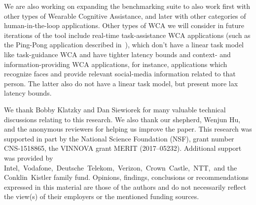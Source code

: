 We are also working on expanding the benchmarking suite to also work first with other types of Wearable Cognitive Assistance, and later with other categories of human-in-the-loop applications.
Other types of WCA we will consider in future iterations of the tool include real-time task-assistance WCA applications (such as the Ping-Pong application described in~\cite{Chen:EarlyImplementation}), which don't have a linear task model like task-guidance WCA and have tighter latency bounds and context- and information-providing WCA applications, for instance, applications which recognize faces and provide relevant social-media information related to that person.
The latter also do not have a linear task model, but present more lax latency bounds.

\begin{acks}
    We thank Bobby Klatzky and Dan Siewiorek for many valuable technical discussions relating to this research.
    We also thank our shepherd, Wenjun Hu, and the anonymous reviewers for helping us improve the paper.
    This research was supported in part by the National Science Foundation (NSF), grant number CNS-1518865, the VINNOVA grant MERIT (2017--05232).
    Additional support was provided by Intel,\ Vodafone,\ Deutsche~Telekom,\ Verizon,\ Crown~Castle,\ NTT,\ and the Conklin~Kistler family fund.
    Opinions, findings, conclusions or recommendations expressed in this material are those of the authors and do not necessarily reflect the view(s) of their employers or the mentioned funding sources.
\end{acks}